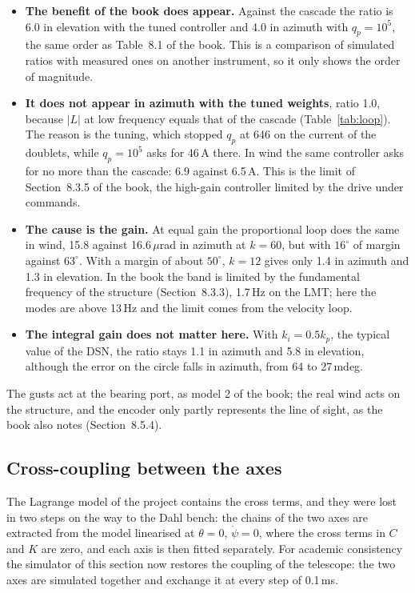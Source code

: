 \documentclass[10pt,a4paper]{article}
\numberwithin{equation}{section}
\begin{document}
\begin{itemize}
\item \textbf{The benefit of the book does appear.} Against the cascade the ratio is 6.0 in elevation with the tuned controller and 4.0 in azimuth with $q_p=10^5$, the same order as Table~8.1 of the book. This is a comparison of simulated ratios with measured ones on another instrument, so it only shows the order of magnitude.
\item \textbf{It does not appear in azimuth with the tuned weights}, ratio 1.0, because $|L|$ at low frequency equals that of the cascade (Table~\ref{tab:loop}). The reason is the tuning, which stopped $q_p$ at 646 on the current of the doublets, while $q_p=10^5$ asks for 46\,A there. In wind the same controller asks for no more than the cascade: 6.9 against 6.5\,A. This is the limit of Section~8.3.5 of the book, the high-gain controller limited by the drive under commands.
\item \textbf{The cause is the gain.} At equal gain the proportional loop does the same in wind, 15.8 against 16.6\,$\mu$rad in azimuth at $k=60$, but with $16^\circ$ of margin against $63^\circ$. With a margin of about $50^\circ$, $k=12$ gives only 1.4 in azimuth and 1.3 in elevation. In the book the band is limited by the fundamental frequency of the structure (Section~8.3.3), 1.7\,Hz on the LMT; here the modes are above 13\,Hz and the limit comes from the velocity loop.
\item \textbf{The integral gain does not matter here.} With $k_i=0.5k_p$, the typical value of the DSN, the ratio stays 1.1 in azimuth and 5.8 in elevation, although the error on the circle falls in azimuth, from 64 to 27\,mdeg.
\end{itemize}

The gusts act at the bearing port, as model 2 of the book; the real wind acts on the structure, and the encoder only partly represents the line of sight, as the book also notes (Section~8.5.4).

\subsection{Cross-coupling between the axes}\label{sec:coupling}
The Lagrange model of the project contains the cross terms, and they were lost in two steps on the way to the Dahl bench: the chains of the two axes are extracted from the model linearised at $\theta=0$, $\dot\psi=0$, where the cross terms in $C$ and $K$ are zero, and each axis is then fitted separately. For academic consistency the simulator of this section now restores the coupling of the telescope: the two axes are simulated together and exchange it at every step of 0.1\,ms.
\end{document}
